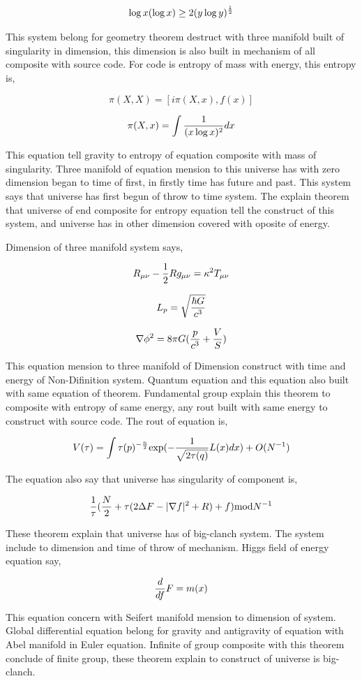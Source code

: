 \documentclass{jsarticle}
\begin{document}
$$ \log x(\log x) \ge 2(y \log y)^{1 \over 2} $$

  This system belong for geometry theorem destruct with three manifold built of singularity in dimension,
this dimension is also built in mechanism of all composite with source code. For code is entropy of mass with
energy, this entropy is,

  $$ \pi (X, X) = [i \pi (X, x), f(x)] $$

  $$ \pi (X, x) = \int {1 \over (x \log x)^2}dx $$

  This equation tell gravity to entropy of equation composite with mass of singularity. Three manifold of equation
mension to this universe has with zero dimension began to time of first, in firstly time has future and past. This
system says that universe has first begun of throw to time system. The explain theorem that universe of end composite
for entropy equation tell the construct of this system, and universe has in other dimension covered with 
oposite of energy.

  Dimension of three manifold system says,

  $$  R_{\mu\nu} - {1 \over 2}Rg_{\mu\nu} = \kappa^2 T_{\mu\nu} $$

  $$ L_{p} = \sqrt{\hbar G \over c^3} $$

  $$ \nabla \phi^2 = 8 \pi G({p \over c^3} + {V \over S}) $$

  This equation mension to three manifold of Dimension construct with time and energy of Non-Difinition system. 
Quantum equation and this equation also built with same equation of theorem. Fundamental group explain this theorem
to composite with entropy of same energy, any rout built with same energy to construct with source code. 
The rout of equation is,

$$ V(\tau) = \int \tau(p)^{-{n \over 2}} \mathrm{exp} (- {1 \over \sqrt{2 \tau (q)}} L(x)dx) + O(N^{-1}) $$

  The equation also say that universe has singularity of component is,

  $$ {1 \over \tau}({N \over 2} + \tau(2\Delta F - |\nabla f|^2 + R) + f) \mathrm{mod} N^{-1} $$

  These theorem explain that universe has of big-clanch system. The system include to dimension and time of
throw of mechanism. Higgs field of energy equation say,

$$ {d \over df}F = m(x) $$

  This equation concern with Seifert manifold mension to dimension of system. Global differential equation
belong for gravity and antigravity of equation with Abel manifold in Euler equation. Infinite of group
composite with this theorem conclude of finite group, these theorem explain to construct of universe is
big-clanch.
\end{document}
